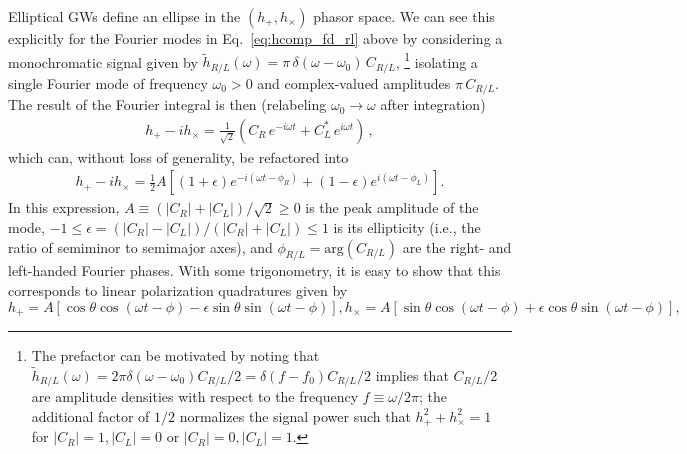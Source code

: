 \documentclass[aps,prd,twocolumn,superscriptaddress,preprintnumbers,floatfix,nofootinbib]{revtex4-2}
\newcommand{\beq}{\begin{equation}}
\newcommand{\eeq}{\end{equation}}
\begin{document}
Elliptical GWs define an ellipse in the $\left(h_+, h_\times\right)$ phasor space.
We can see this explicitly for the Fourier modes in Eq.~\eqref{eq:hcomp_fd_rl} above by considering a monochromatic signal given by $\tilde{h}_{R/L}(\omega) = \pi\, \delta(\omega-\omega_0)\, C_{R/L} $,%
\footnote{The prefactor can be motivated by noting that $\tilde{h}_{R/L}(\omega) = 2\pi \delta(\omega - \omega_0) C_{R/L}/2 = \delta(f - f_0) C_{R/L} / 2$ implies that $C_{R/L}/2$ are amplitude densities with respect to the frequency $f \equiv \omega/2\pi$; the additional factor of $1/2$ normalizes the signal power such that $h_+^2 + h_\times^2 = 1$ for $|C_R|=1, |C_L|=0$ or $|C_R|=0, |C_L|=1$.}
isolating a single Fourier mode of frequency $\omega_0 >0$ and complex-valued amplitudes $\pi\, C_{R/L}$.
The result of the Fourier integral is then (relabeling $\omega_0 \to \omega$ after integration)
\begin{align} \label{eq:ellip_circ}
h_+ - i h_\times =\frac{1}{\sqrt{2}} \left( C_R\, e^{-i \omega t} + C^*_L\, e^{i\omega t}\right)\, ,
\end{align}
which can, without loss of generality, be refactored into
\begin{align}
h_+ - i h_\times = \frac{1}{2}A\left[ \left(1+\epsilon\right) e^{-i (\omega t - \phi_R)} + \left(1-\epsilon\right) e^{i (\omega t - \phi_L)} \right] .
\end{align}
% 
In this expression, 
$A \equiv (|{C}_R| + |{C}_L| )/ \sqrt{2} \geq 0$ is the peak amplitude of the mode, $-1 \leq \epsilon = (|{C}_R| - |{C}_L|)/(|{C}_R| + |{C}_L|) \leq 1$ is its ellipticity (i.e., the ratio of semiminor to semimajor axes), and $\phi_{R/L} = \mathrm{arg}({C}_{R/L})$ are the right- and left-handed Fourier phases.
With some trigonometry, it is easy to show that this corresponds to linear polarization quadratures given by
\begin{subequations} \label{eq:hcomp_ellip}
\beq
h_+ = A \left[\cos \theta \cos(\omega t - \phi) - \epsilon \sin \theta \sin(\omega t - \phi)\right] ,
\eeq
\beq
h_\times = A \left[\sin \theta \cos(\omega t - \phi) + \epsilon \cos \theta \sin(\omega t - \phi)\right] ,
\eeq
\end{subequations}
\end{document}
